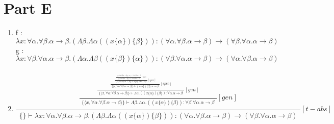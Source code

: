\documentclass[onecolumn,11pt]{article}
\newcommand{\post}[2]{\ensuremath{\frac{\begin{array}{c}#1\end{array}}{\begin{array}{c}#2\end{array}}}}
\begin{document}
\section*{Part E}

\begin{enumerate}

\item 
  f : $\lambda x : \forall \alpha . \forall \beta. \alpha \rightarrow \beta. (\Lambda \beta. \Lambda \alpha ((x\{\alpha\})\{\beta\})) : (\forall \alpha . \forall \beta . \alpha \rightarrow \beta) \rightarrow (\forall \beta. \forall \alpha. \alpha \rightarrow \beta) $ \\
  g : $\lambda x : \forall \beta . \forall \alpha. \alpha \rightarrow \beta. (\Lambda \alpha. \Lambda \beta ((x\{\beta\})\{\alpha\})): (\forall \beta . \forall \alpha . \alpha \rightarrow \beta) \rightarrow (\forall \alpha. \forall \beta. \alpha \rightarrow \beta) $

\item 

\[
\post
{ \post
  { \post
    { \post
      { \post
        { \post
          { \{\langle x, \forall \alpha. \forall \beta. \alpha \rightarrow \beta \rangle \}(x)  = \forall \alpha. \forall \beta. \alpha \rightarrow \beta }
          { \{\langle x, \forall \alpha. \forall \beta. \alpha \rightarrow \beta \rangle \} \vdash x : \forall \alpha. \forall \beta . \alpha \rightarrow \beta } [var]
        } 
        { \{\langle x, \forall \alpha. \forall \beta. \alpha \rightarrow \beta \rangle \} \vdash x\{\alpha\} : \forall \beta.\alpha \rightarrow \beta } [spec]
      }
      { \{\langle x, \forall \alpha. \forall \beta. \alpha \rightarrow \beta \rangle \} \vdash (x\{\alpha\})\{\beta\} : \alpha \rightarrow \beta } [spec]
    }
    { \{\langle x, \forall \alpha. \forall \beta. \alpha \rightarrow \beta \rangle \} \vdash \Lambda \alpha . ((x\{\alpha\})\{\beta\}) : \forall \alpha . \alpha \rightarrow \beta } [gen]
  }
 { \{\langle x, \forall \alpha. \forall \beta. \alpha \rightarrow \beta \rangle \} \vdash \Lambda \beta. \Lambda \alpha. ((x\{\alpha\})\{\beta\}) : \forall \beta. \forall \alpha. \alpha \rightarrow \beta } [gen]
}
{ \{\} \vdash \lambda x : \forall \alpha . \forall \beta. \alpha \rightarrow \beta. (\Lambda \beta. \Lambda \alpha ((x\{\alpha\})\{\beta\})): (\forall \alpha . \forall \beta . \alpha \rightarrow \beta) \rightarrow (\forall \beta. \forall \alpha. \alpha \rightarrow \beta) } [t-abs]
\]


\end{enumerate}
\end{document}
